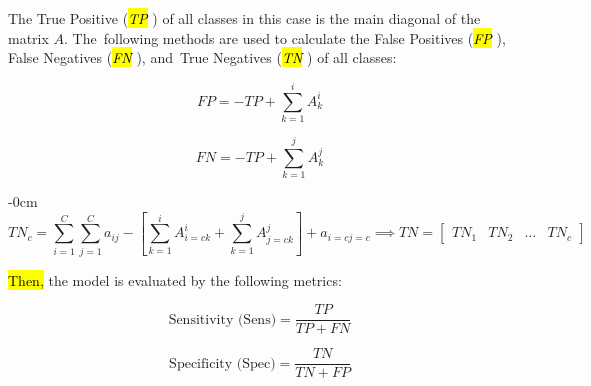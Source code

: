\documentclass[sensors,article,accept,pdftex,moreauthors]{Definitions/mdpi}
\begin{document}
	The True Positive (\hl{\textit{TP}}%
) of all classes in this case is the main diagonal of the matrix $A$. The~following methods are used to calculate the False Positives (\hl{\textit{FP}}%
), False Negatives (\hl{\textit{FN}}%
), and~True Negatives (\hl{\textit{TN}}%
) of all classes:
	
	\begin{equation}
		\label{eqn:FP}
		FP = -TP + \sum_{k=1}^{i}A^i_k
	\end{equation}
	
	\begin{equation}
		\label{eqn:FN}
		FN = -TP + \sum_{k=1}^{j}A^j_k
	\end{equation}
	

\begin{adjustwidth}{-\extralength}{0cm}
	\begin{equation}
		\label{eqn:TN}
		TN_c = \sum_{i=1}^{C}\sum_{j=1}^{C}a_{ij} - \left[ \sum_{k=1}^{i}A^i_{i=c k} + \sum_{k=1}^{j}A^j_{j=c k} \right] + a_{i=c j=c} \implies TN = \begin{bmatrix}
TN_1 & TN_2 & \dots & TN_c
		\end{bmatrix}
	\end{equation}
\end{adjustwidth}
	
	\hl{Then,} %
 the model is evaluated by the following metrics:
	
	\begin{equation}
		\label{eqn:sens}
		\text{Sensitivity (Sens)} = \frac{TP}{TP + FN}
	\end{equation}
	
	\begin{equation}
		\label{eqn:spec}
		\text{Specificity (Spec)} = \frac{TN}{TN + FP}
	\end{equation}
	
\end{document}
